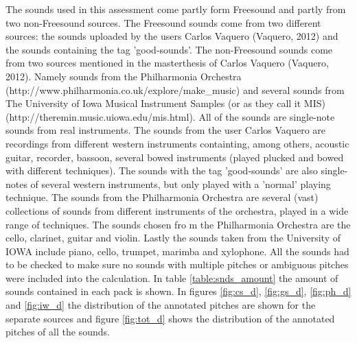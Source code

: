 \documentclass{proc}
\begin{document}
The sounds used in this assessment come partly form Freesound and partly from two non-Freesound sources. The Freesound sounds come from two different sources: the sounds uploaded by the users Carlos Vaquero (Vaquero, 2012) and the sounds containing the tag 'good-sounds'. The non-Freesound sounds come from two sources mentioned in the masterthesis of Carlos Vaquero (Vaquero, 2012). Namely sounds from the Philharmonia Orchestra (http://www.philharmonia.co.uk/explore/make\_music) and several sounds from The University of Iowa Musical Instrument Samples (or as they call it MIS) (http://theremin.music.uiowa.edu/mis.html). All of the sounds are single-note sounds from real instruments. The sounds from the user Carlos Vaquero are recordings from different western instruments containting, among others, acoustic guitar, recorder, bassoon, several bowed instruments (played plucked and bowed with different techniques). The sounds with the tag 'good-sounds' are also single-notes of several western instruments, but only played with a 'normal' playing technique. The sounds from the Philharmonia Orchestra are several (vast) collections of sounds from different instruments of the orchestra, played in a wide range of techniques. The sounds chosen fro m the Philharmonia Orchestra are the cello, clarinet, guitar and violin. Lastly the sounds taken from the University of IOWA include piano, cello, trumpet, marimba and xylophone. All the sounds had to be checked to make sure no sounds with multiple pitches or ambiguous pitches were included into the calculation. In table \ref{table:snds_amount} the amount of sounds contained in each pack is shown. In figures \ref{fig:cs_d}, \ref{fig:gs_d}, \ref{fig:ph_d} and \ref{fig:iw_d} the distribution of the annotated pitches are shown for the separate sources and figure \ref{fig:tot_d} shows the distribution of the annotated pitches of all the sounds.
\end{document}
